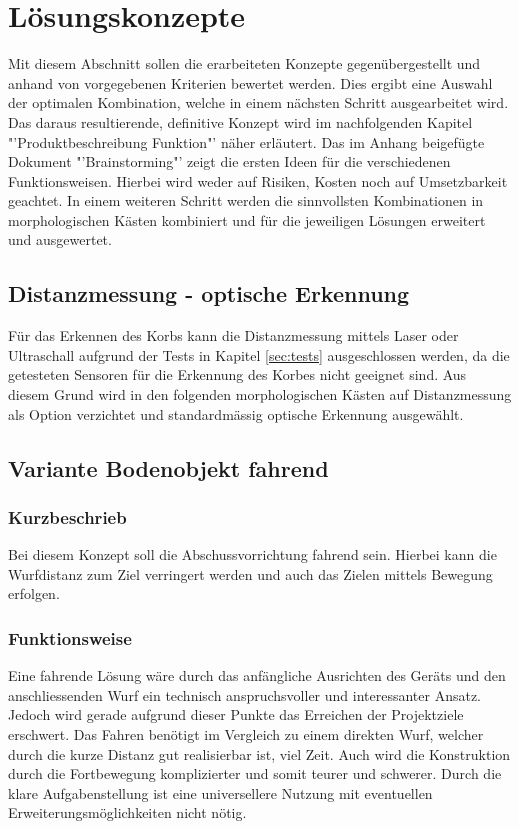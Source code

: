 \section{Lösungskonzepte}
Mit diesem Abschnitt sollen die erarbeiteten Konzepte gegenübergestellt und 
anhand von vorgegebenen Kriterien bewertet werden. Dies ergibt eine 
Auswahl der optimalen Kombination, welche in einem nächsten Schritt 
ausgearbeitet wird. Das daraus resultierende, definitive Konzept wird im 
nachfolgenden Kapitel "'Produktbeschreibung Funktion"' näher erläutert. 
Das im Anhang beigefügte Dokument "'Brainstorming"' zeigt die ersten Ideen für 
die verschiedenen Funktionsweisen. Hierbei wird weder auf Risiken, Kosten 
noch auf Umsetzbarkeit geachtet. In einem weiteren Schritt werden die 
sinnvollsten Kombinationen in morphologischen Kästen kombiniert und für die 
jeweiligen Lösungen erweitert und ausgewertet. 

\subsection{Distanzmessung - optische Erkennung}
Für das Erkennen des Korbs kann die Distanzmessung mittels Laser oder Ultraschall 
aufgrund der Tests in Kapitel \ref{sec:tests} ausgeschlossen werden, da die 
getesteten Sensoren für die Erkennung des Korbes nicht geeignet sind. 
Aus diesem Grund wird in den folgenden morphologischen Kästen auf 
Distanzmessung als Option verzichtet und standardmässig 
optische Erkennung ausgewählt.

\subsection{Variante Bodenobjekt fahrend}
\subsubsection{Kurzbeschrieb}
Bei diesem Konzept soll die Abschussvorrichtung fahrend sein. Hierbei kann 
die  Wurfdistanz zum Ziel verringert werden und auch das Zielen mittels 
Bewegung erfolgen.

\subsubsection{Funktionsweise}
Eine fahrende Lösung wäre durch das anfängliche Ausrichten des Geräts und 
den anschliessenden Wurf ein technisch anspruchsvoller und interessanter 
Ansatz. Jedoch wird gerade aufgrund dieser Punkte das Erreichen der 
Projektziele erschwert. Das Fahren benötigt im Vergleich zu einem direkten 
Wurf, welcher durch die kurze Distanz gut realisierbar ist, viel Zeit. Auch 
wird die Konstruktion durch die Fortbewegung komplizierter und somit 
teurer und schwerer. Durch die klare Aufgabenstellung ist eine 
universellere Nutzung mit eventuellen Erweiterungsmöglichkeiten nicht nötig. 

